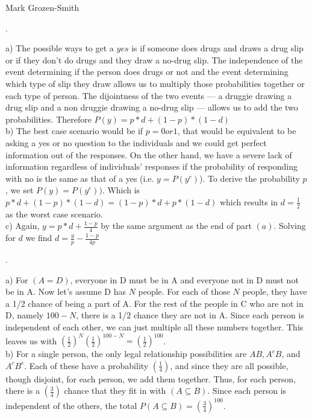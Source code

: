 \documentclass[11pt]{article}
\begin{document}
 \hfill Mark Grozen-Smith

\bigskip

.

	a) The possible ways to get a $yes$ is if someone does drugs and draws a drug slip or if they don't do drugs and they draw a no-drug slip.  The independence of the event determining if the person does drugs or not and the event determining which type of slip they draw allows us to multiply those probabilities together or each type of person.  The dijointness of the two events --- a druggie drawing a drug slip and a non druggie drawing a no-drug slip --- allows us to add the two probabilities.  Therefore $\boxed{P(y) = p*d + (1-p)*(1-d)}$
\\

	b) The best case scenario would be if $p = 0 or 1$, that would be equivalent to be asking a yes or no question to the individuals and we could get perfect information out of the responses.  On the other hand, we have a severe lack of information regardless of individuals' responses if the probability of responding with no is the same as that of a yes (i.e. $y = P(y^{c})$). To derive the probability $p$, we set $P(y) = P(y^{c}))$.  Which is $p*d + (1-p)*(1-d) = (1-p)*d + p*(1-d) $ which results in $\boxed{d=\frac{1}{2}}$ as the worst case scenario.  
\\

	c) Again, $y = p*d + \frac{1-p}{4}$ by the same argument as the end of part $(a)$.  
	Solving for $d$ we find $\boxed{d = \frac{y}{p} - \frac{1-p}{4p}}$
\bigskip

.

	a) For $(A=D)$, everyone in D must be in A and everyone not in D must not be in A.  Now let's assume D has $N$ people.  For each of those $N$ people, they have a 1/2 chance of being a part of A.  For the rest of the people in C who are not in D, namely $100-N$, there is a 1/2 chance they are not in A.  Since each person is independent of each other, we can just multiple all these numbers together.  This leaves us with $(\frac{1}{2})^{N}(\frac{1}{2})^{100-N} = \boxed{(\frac{1}{2})^{100}}$.
\\

	b) For a single person, the only legal relationship possibilities are $AB, A^{c}B$, and $A^{c}B^{c}$.  Each of these have a probability $(\frac{1}{4})$, and since they are all possible, though disjoint, for each person, we add them together.  Thus, for each person, there is a $(\frac{3}{4})$ chance that they fit in with $(A\subseteq B)$. Since each person is independent of the others, the total $P(A\subseteq B) = \boxed{(\frac{3}{4})^{100}}$.
\\
\end{document}
